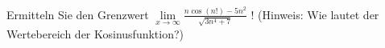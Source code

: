\item 
Ermitteln Sie den Grenzwert $\lim\limits_{x \to \infty} \frac{n\cos(n!)-5n^2}{\sqrt{3n^4+7}}$ ! (Hinweis: Wie lautet der Wertebereich der Kosinusfunktion?)

